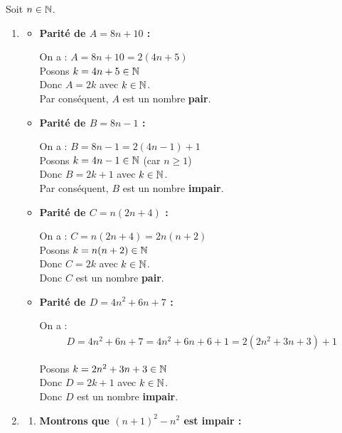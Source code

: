 \documentclass[10pt, a4paper]{article}
\begin{document}
\begin{Solution}[APPLICATION][1]
Soit $n \in \mathbb{N}$.
\begin{enumerate}[leftmargin=*,itemsep=0.5pt]
    \item
    \begin{itemize}[leftmargin=*,itemsep=0.5pt]
        \item \textbf{Parité de $A = 8n + 10$ :}

    On a : $A = 8n + 10 = 2(4n + 5)$ \\
    Posons $k = 4n + 5 \in \mathbb{N}$ \\
    Donc $A = 2k$ avec $k \in \mathbb{N}$. \\
    Par conséquent, $A$ est un nombre \textbf{pair}.

        \item \textbf{Parité de $B = 8n - 1$ :}
        
    On a : $B = 8n - 1 = 2(4n - 1) + 1$ \\
    Posons $k = 4n - 1 \in \mathbb{N}$ (car $n \geq 1$) \\
    Donc $B = 2k + 1$ avec $k \in \mathbb{N}$. \\
    Par conséquent, $B$ est un nombre \textbf{impair}.

        \item \textbf{Parité de $C = n(2n + 4)$ :}

    On a : $C = n(2n + 4) = 2n(n + 2)$ \\
    Posons $k = n(n + 2) \in \mathbb{N}$ \\
    Donc $C = 2k$ avec $k \in \mathbb{N}$. \\
    Donc $C$ est un nombre \textbf{pair}.


        \item \textbf{Parité de $D = 4n^2 + 6n + 7$ :}

    On a :
    \begin{align*}
        D = 4n^2 + 6n + 7 
          = 4n^2 + 6n + 6 + 1 
          = 2(2n^2 + 3n + 3) + 1
    \end{align*}

    Posons $k = 2n^2 + 3n + 3 \in \mathbb{N}$ \\
    Donc $D = 2k + 1$ avec $k \in \mathbb{N}$. \\
    Donc  $D$ est un nombre \textbf{impair}.
    \end{itemize}

    \item
    \begin{enumerate}[leftmargin=*,itemsep=0.5pt]
        \item \textbf{Montrons que $(n+1)^2 - n^2$ est impair :}


\end{enumerate}
\end{enumerate}
\end{Solution}
\end{document}
